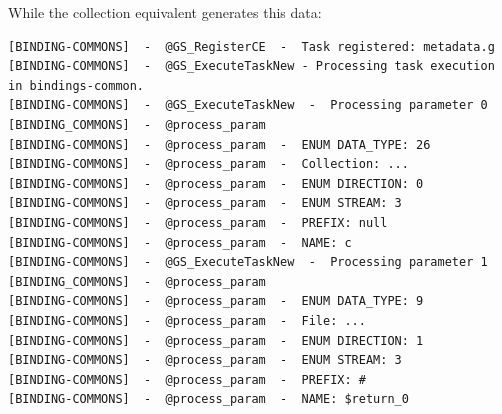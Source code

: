 While the collection equivalent generates this data:

\begin{verbatim}
[BINDING-COMMONS]  -  @GS_RegisterCE  -  Task registered: metadata.g
[BINDING-COMMONS]  -  @GS_ExecuteTaskNew - Processing task execution in bindings-common. 
[BINDING-COMMONS]  -  @GS_ExecuteTaskNew  -  Processing parameter 0
[BINDING_COMMONS]  -  @process_param
[BINDING-COMMONS]  -  @process_param  -  ENUM DATA_TYPE: 26
[BINDING-COMMONS]  -  @process_param  -  Collection: ...
[BINDING-COMMONS]  -  @process_param  -  ENUM DIRECTION: 0
[BINDING-COMMONS]  -  @process_param  -  ENUM STREAM: 3
[BINDING-COMMONS]  -  @process_param  -  PREFIX: null
[BINDING-COMMONS]  -  @process_param  -  NAME: c
[BINDING-COMMONS]  -  @GS_ExecuteTaskNew  -  Processing parameter 1
[BINDING_COMMONS]  -  @process_param
[BINDING-COMMONS]  -  @process_param  -  ENUM DATA_TYPE: 9
[BINDING-COMMONS]  -  @process_param  -  File: ...
[BINDING-COMMONS]  -  @process_param  -  ENUM DIRECTION: 1
[BINDING-COMMONS]  -  @process_param  -  ENUM STREAM: 3
[BINDING-COMMONS]  -  @process_param  -  PREFIX: #
[BINDING-COMMONS]  -  @process_param  -  NAME: $return_0
\end{verbatim}
